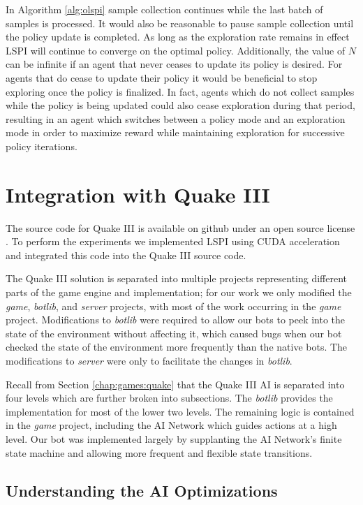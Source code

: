 In Algorithm \ref{alg:olspi} sample collection continues while the last batch of samples is processed. It would also be reasonable to pause sample collection until the policy update is completed. As long as the exploration rate remains in effect LSPI will continue to converge on the optimal policy. Additionally, the value of $N$ can be infinite if an agent that never ceases to update its policy is desired. For agents that do cease to update their policy it would be beneficial to stop exploring once the policy is finalized. In fact, agents which do not collect samples while the policy is being updated could also cease exploration during that period, resulting in an agent which switches between a policy mode and an exploration mode in order to maximize reward while maintaining exploration for successive policy iterations.

\section{Integration with Quake III}

The source code for Quake III is available on github under an open source license \cite{q3code}. To perform the experiments we implemented LSPI using CUDA acceleration and integrated this code into the Quake III source code.

The Quake III solution is separated into multiple projects representing different parts of the game engine and implementation; for our work we only modified the \emph{game}, \emph{botlib}, and \emph{server} projects, with most of the work occurring in the \emph{game} project. Modifications to \emph{botlib} were required to allow our bots to peek into the state of the environment without affecting it, which caused bugs when our bot checked the state of the environment more frequently than the native bots. The modifications to \emph{server} were only to facilitate the changes in \emph{botlib}.

Recall from Section \ref{chap:games:quake} that the Quake III AI is separated into four levels which are further broken into subsections. The \emph{botlib} provides the implementation for most of the lower two levels. The remaining logic is contained in the \emph{game} project, including the AI Network which guides actions at a high level. Our bot was implemented largely by supplanting the AI Network's finite state machine and allowing more frequent and flexible state transitions.

\subsection{Understanding the AI Optimizations}

